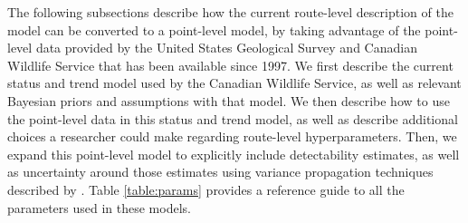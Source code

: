\documentclass[12pt]{article}
\begin{document}
\par The following subsections describe how the current route-level description of the model can be converted to a point-level model, by taking advantage of the point-level data provided by the United States Geological Survey and Canadian Wildlife Service that has been available since 1997. 
We first describe the current status and trend model used by the Canadian Wildlife Service, as well as relevant Bayesian priors and assumptions with that model.
We then describe how to use the point-level data in this status and trend model, as well as describe additional choices a researcher could make regarding route-level hyperparameters.
Then, we expand this point-level model to explicitly include detectability estimates, as well as uncertainty around those estimates using variance propagation techniques described by \citep{bravington_variance_2021}.
Table \ref{table:params} provides a reference guide to all the parameters used in these models.
\end{document}
